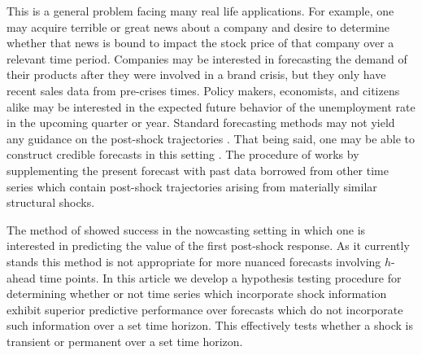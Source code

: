 \documentclass[11pt]{article}
\theoremstyle{definition}
\begin{document}
This is a general problem facing many real life applications. For example, one may acquire terrible or great news about a company and desire to determine whether that news is bound to impact the stock price of that company over a relevant time period.  Companies may be interested in forecasting the demand of their products after they were involved in a brand crisis, but they only have recent sales data from pre-crises times. Policy makers, economists, and citizens alike may be interested in the expected future behavior of the unemployment rate in the upcoming quarter or year. %
Standard forecasting methods may not yield any guidance on the post-shock trajectories \citep{baumeister2014real}. That being said, one may be able to construct credible forecasts in this setting \citep{lin2021minimizing}. The procedure of \cite{lin2021minimizing} works by supplementing the present forecast with past data borrowed from other time series which contain post-shock trajectories arising from materially similar structural shocks.

The method of \cite{lin2021minimizing} showed success in the nowcasting setting in which one is interested in predicting the value of the first post-shock response. As it currently stands this method is not appropriate for more nuanced forecasts involving $h$-ahead time points. In this article we develop a  hypothesis testing procedure for determining whether or not time series which incorporate shock information exhibit superior predictive performance over forecasts which do not incorporate such information over a set time horizon. This effectively tests whether a shock is transient or permanent over a set time horizon.
\end{document}
